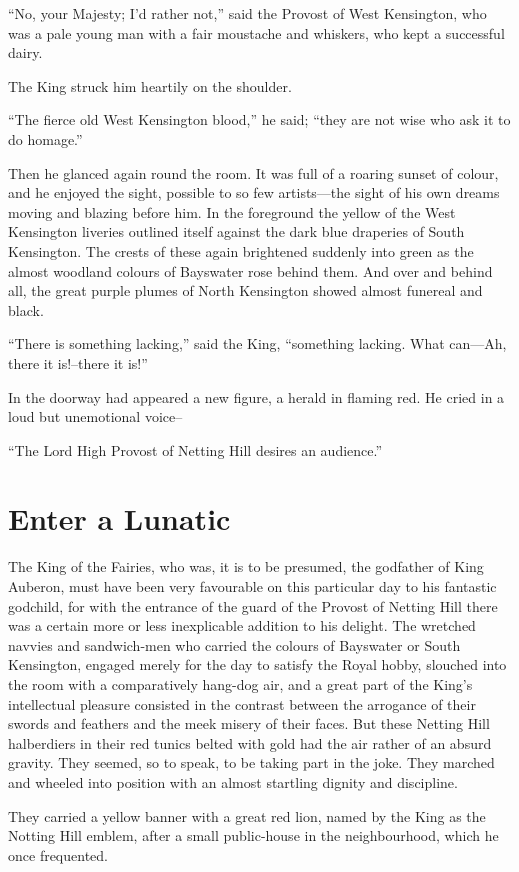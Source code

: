 \documentclass{book}
\begin{document}
“No, your Majesty; I’d rather not,” said the Provost of West Kensington, who was a pale young man with a fair moustache and whiskers, who kept a successful dairy.

The King struck him heartily on the shoulder.

“The fierce old West Kensington blood,” he said; “they are not wise who ask it to do homage.”

Then he glanced again round the room. It was full of a roaring sunset of colour, and he enjoyed the sight, possible to so few artists—the sight of his own dreams moving and blazing before him. In the foreground the yellow of the West Kensington liveries outlined itself against the dark blue draperies of South Kensington. The crests of these again brightened suddenly into green as the almost woodland colours of Bayswater rose behind them. And over and behind all, the great purple plumes of North Kensington showed almost funereal and black.

“There is something lacking,” said the King, “something lacking. What can—Ah, there it is!–there it is!”

In the doorway had appeared a new figure, a herald in flaming red. He cried in a loud but unemotional voice–

“The Lord High Provost of Netting Hill desires an audience.”

\chapter{Enter a Lunatic}
\label{chapter-7}
The King of the Fairies, who was, it is to be presumed, the godfather of King Auberon, must have been very favourable on this particular day to his fantastic godchild, for with the entrance of the guard of the Provost of Netting Hill there was a certain more or less inexplicable addition to his delight. The wretched navvies and sandwich-men who carried the colours of Bayswater or South Kensington, engaged merely for the day to satisfy the Royal hobby, slouched into the room with a comparatively hang-dog air, and a great part of the King’s intellectual pleasure consisted in the contrast between the arrogance of their swords and feathers and the meek misery of their faces. But these Netting Hill halberdiers in their red tunics belted with gold had the air rather of an absurd gravity. They seemed, so to speak, to be taking part in the joke. They marched and wheeled into position with an almost startling dignity and discipline.

They carried a yellow banner with a great red lion, named by the King as the Notting Hill emblem, after a small public-house in the neighbourhood, which he once frequented.
\end{document}
